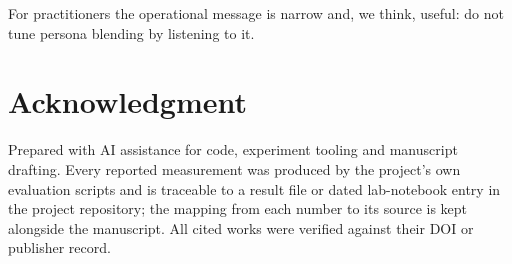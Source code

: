 \documentclass[conference]{IEEEtran}
\begin{document}
For practitioners the operational message is narrow and, we think, useful: do
not tune persona blending by listening to it.

\section*{Acknowledgment}

Prepared with AI assistance for code, experiment tooling and manuscript
drafting. Every reported measurement was produced by the project's own
evaluation scripts and is traceable to a result file or dated lab-notebook
entry in the project repository; the mapping from each number to its source is
kept alongside the manuscript. All cited works were verified against their DOI
or publisher record.



\end{document}
